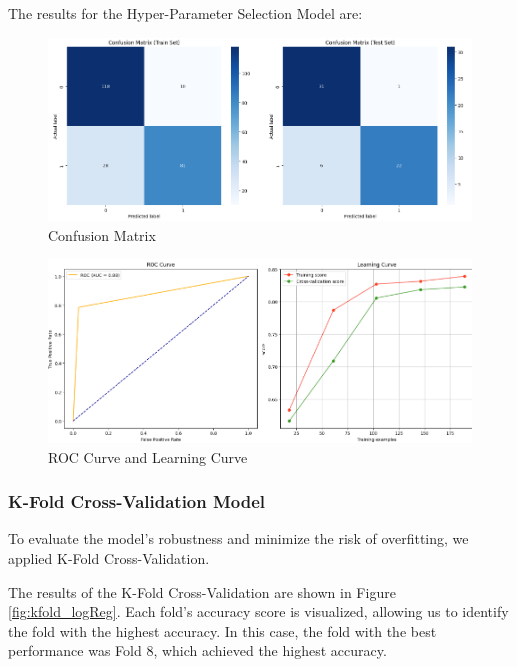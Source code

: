 The results for the Hyper-Parameter Selection Model are:
\begin{figure}[H]
    \centering
    \includegraphics[width=1\linewidth]{images/confusion_matrix_lg_reg_search.png}
    \caption{Confusion Matrix}
    \label{fig:enter-label}
\end{figure}
\begin{figure}[H]
    \centering
    \includegraphics[width=1\linewidth]{images/roc_learning_logreg_search.png}
    \caption{ROC Curve and Learning Curve}%
    \label{fig:enter-label}
\end{figure}


\subsubsection{K-Fold Cross-Validation Model}

To evaluate the model's robustness and minimize the risk of overfitting, we applied K-Fold Cross-Validation. 

The results of the K-Fold Cross-Validation are shown in Figure \ref{fig:kfold_logReg}. Each fold's accuracy score is visualized, allowing us to identify the fold with the highest accuracy. In this case, the fold with the best performance was Fold 8, which achieved the highest accuracy.

